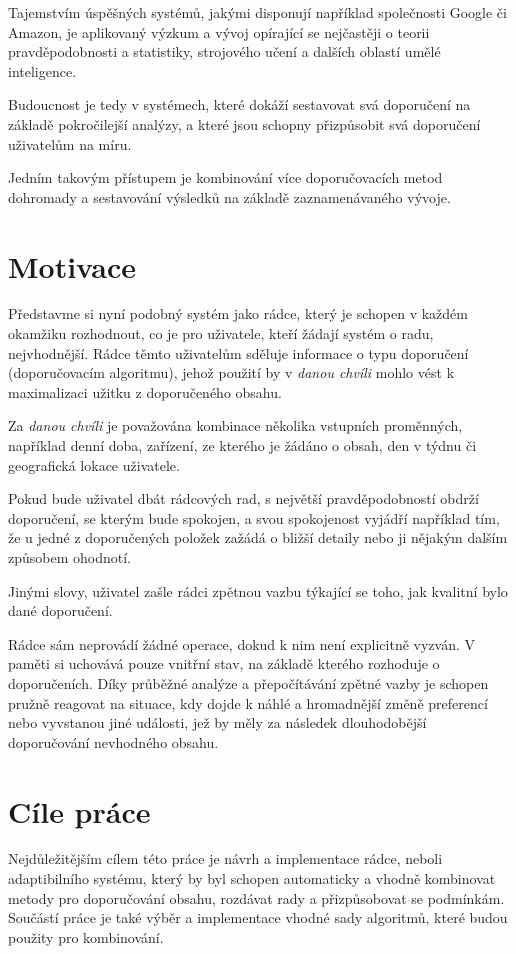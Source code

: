 \documentclass[thesis=M,czech]{FITthesis}[2014/05/07]
\begin{document}
\begin{introduction}
	Tajemstvím úspěšných systémů, jakými disponují například společnosti Google či Amazon, je aplikovaný výzkum a vývoj opírající se nejčastěji o teorii pravděpodobnosti a statistiky, strojového učení a dalších oblastí umělé inteligence.

	Budoucnost je tedy v systémech, které dokáží sestavovat svá doporučení na základě pokročilejší analýzy, a které jsou schopny přizpůsobit svá doporučení uživatelům na míru.
	
	Jedním takovým přístupem je kombinování více doporučovacích metod dohromady a sestavování výsledků na základě zaznamenávaného vývoje.

\section{Motivace} 	
\label{sec:motivation}
	Představme si nyní podobný systém jako rádce, který je schopen v každém okamžiku rozhodnout, co je pro uživatele, kteří žádají systém o radu, nejvhodnější. Rádce těmto uživatelům sděluje informace o typu doporučení (doporučovacím algoritmu), jehož použití by v \emph{danou chvíli} mohlo vést k maximalizaci užitku z doporučeného obsahu.
	
	Za \emph{danou chvíli} je považována kombinace několika vstupních proměnných, například denní doba, zařízení, ze kterého je žádáno o obsah, den v týdnu či geografická lokace uživatele.
	
	Pokud bude uživatel dbát rádcových rad, s největší pravděpodobností obdrží doporučení, se kterým bude spokojen, a svou spokojenost vyjádří například tím, že u jedné z doporučených položek zažádá o bližší detaily nebo ji nějakým dalším způsobem ohodnotí. 
	
	Jinými slovy, uživatel zašle rádci zpětnou vazbu týkající se toho, jak kvalitní bylo dané doporučení.
	
	Rádce sám neprovádí žádné operace, dokud k nim není explicitně vyzván. V paměti si uchovává pouze vnitřní stav, na základě kterého rozhoduje o doporučeních. Díky průběžné analýze a přepočítávání zpětné vazby je schopen pružně reagovat na situace, kdy dojde k náhlé a hromadnější změně preferencí nebo vyvstanou jiné události, jež by měly za následek dlouhodobější doporučování nevhodného obsahu.
	
\section{Cíle práce}
\label{sec:objectives}
	Nejdůležitějším cílem této práce je návrh a implementace rádce, neboli adaptibilního systému, který by byl schopen automaticky a vhodně kombinovat metody pro doporučování obsahu, rozdávat rady a přizpůsobovat se podmínkám. Součástí práce je také výběr a implementace vhodné sady algoritmů, které budou použity pro kombinování.


\end{introduction}
\end{document}
